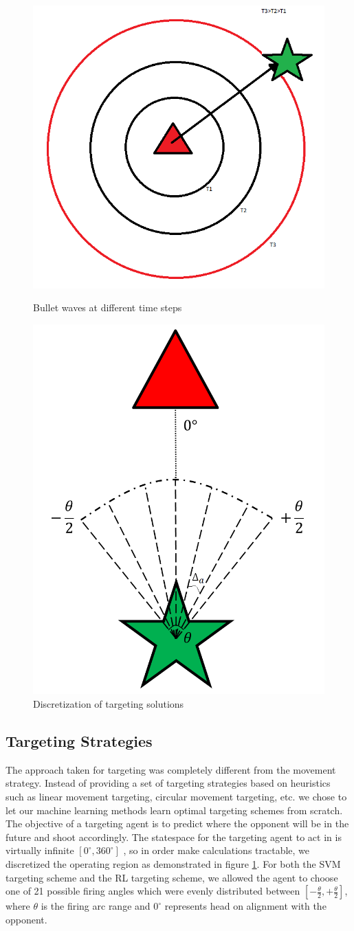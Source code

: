 \documentclass{article}
\theoremstyle{plain}
\theoremstyle{definition}
\theoremstyle{remark}
\begin{document}
\begin{figure}[t]
\begin{minipage}[b]{0.5\linewidth}
	\centering
		\includegraphics[width=5 cm]{bullet_wave.png}
	\caption{Bullet waves at different time steps}
	\label{b_wave}
\end{minipage}
\hspace{0.5cm}
\begin{minipage}[b]{0.5\linewidth}
\centering
		\includegraphics[width=5 cm]{targeting.png}
	\caption{Discretization of targeting solutions}
	\label{tget}
\end{minipage}
\end{figure}

\subsection*{Targeting Strategies}
The approach taken for targeting was completely different from the movement strategy. Instead of providing a set of targeting strategies based on heuristics such as linear movement targeting, circular movement targeting, etc. we chose to let our machine learning methods learn optimal targeting schemes from scratch. The objective of a targeting agent is to predict where the opponent will be in the future and shoot accordingly. The statespace for the targeting agent to act in is virtually infinite $[0^{\circ}, 360^{\circ}]$ , so in order make calculations tractable, we discretized the operating region as demonstrated in figure \ref{tget}. For both the SVM targeting scheme and the RL targeting scheme, we allowed the agent to choose one of 21 possible firing angles which were evenly distributed between $[-\frac{\theta}{2}, +\frac{\theta}{2}]$, where $\theta$ is the firing arc range and $0^{\circ}$ represents head on alignment with the opponent.
\end{document}
